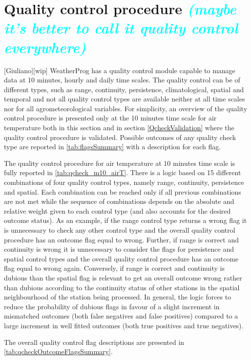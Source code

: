 \documentclass[authoryear,preprint,review,12pt]{elsarticle}
\newcommand{\review}[1]{\emph{\textcolor{cyan}{#1}}}
\begin{document}
\section{Quality control procedure \review{(maybe it's better to call it quality control everywhere)}}[Giuliano][wip] \label{sec:qcheck}
WeatherProg has a quality control module capable to manage data at 10 minutes, hourly and daily time scales.
The quality control can be of different types, such as range, continuity, persistence, climatological, spatial and temporal and not all quality control types are available neither at all time scales nor for all agrometeorological variables.
For simplicity, an overview of the quality control procedure is presented only at the 10 minutes time scale for air temperature both in this section and in section \ref{QcheckValidation} where the quality control procedure is validated.
Possible outcomes of any quality check type are reported in \cref{tab:flagsSummary} with a description for each flag.

The quality control procedure for air temperature at 10 minutes time scale is fully reported in \cref{tab:qcheck_m10_airT}. There is a logic based on 15 different combinations of four quality control types, namely range, continuity, persistence and spatial.
Each combination can be reached only if all previous combinations are not met while the sequence of combinations depends on the absolute and relative weight given to each control type (and also accounts for the desired outcome status).
As an example, if the range control type returns a wrong flag it is unnecessary to check any other control type and the overall quality control procedure has an outcome flag equal to wrong.
Further, if range is correct and continuity is wrong it is unnecessary to consider the flags for persistence and spatial control types and the overall quality control procedure has an outcome flag equal to wrong again.
Conversely, if range is correct and continuity is dubious than the spatial flag is relevant to get an overall outcome wrong rather than dubious according to the continuity status of other stations in the spatial neighbourhood of the station being processed.
In general, the logic forces to reduce the probability of dubious flags in favour of a slight increment in mismatched outcomes (both false negatives and false positives) compared to a large increment in well fitted outcomes (both true positives and true negatives).

The overall quality control flag descriptions are presented in \cref{tab:qcheckOutcomeFlagsSummary}.
\end{document}

